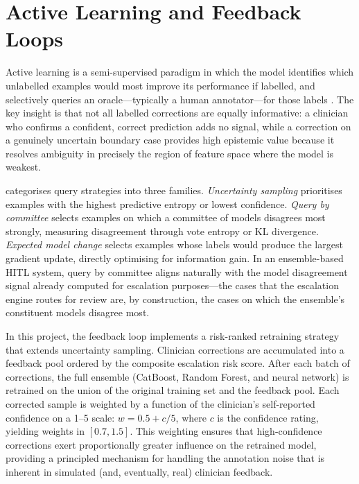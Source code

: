 \section{Active Learning and Feedback Loops}
\label{sec:active-learning}

Active learning is a semi-supervised paradigm in which the model identifies
which unlabelled examples would most improve its performance if labelled, and
selectively queries an oracle---typically a human annotator---for those labels
\citep{settles2009active}. The key insight is that not all labelled corrections
are equally informative: a clinician who confirms a confident, correct
prediction adds no signal, while a correction on a genuinely uncertain boundary
case provides high epistemic value because it resolves ambiguity in precisely
the region of feature space where the model is weakest.

\citet{settles2009active} categorises query strategies into three families.
\emph{Uncertainty sampling} prioritises examples with the highest predictive
entropy or lowest confidence. \emph{Query by committee} selects examples on
which a committee of models disagrees most strongly, measuring disagreement
through vote entropy or KL divergence. \emph{Expected model change} selects
examples whose labels would produce the largest gradient update, directly
optimising for information gain. In an ensemble-based HITL system, query by
committee aligns naturally with the model disagreement signal already computed
for escalation purposes---the cases that the escalation engine routes for
review are, by construction, the cases on which the ensemble's constituent
models disagree most.

In this project, the feedback loop implements a risk-ranked retraining strategy
that extends uncertainty sampling. Clinician corrections are accumulated into a
feedback pool ordered by the composite escalation risk score. After each batch
of corrections, the full ensemble (CatBoost, Random Forest, and neural network)
is retrained on the union of the original training set and the feedback pool.
Each corrected sample is weighted by a function of the clinician's self-reported
confidence on a 1--5 scale: $w = 0.5 + c/5$, where $c$ is the confidence
rating, yielding weights in $[0.7, 1.5]$. This weighting ensures that
high-confidence corrections exert proportionally greater influence on the
retrained model, providing a principled mechanism for handling the annotation
noise that is inherent in simulated (and, eventually, real) clinician feedback.


